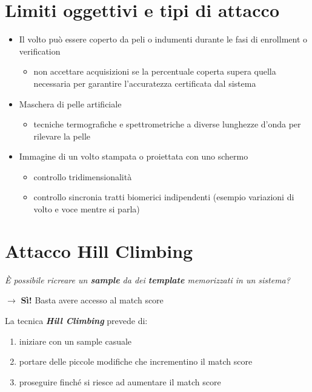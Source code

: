 \documentclass{report}
\begin{document}
\section{Limiti oggettivi e tipi di attacco}
\begin{itemize}
    \item Il volto può essere coperto da peli o indumenti durante 
    le fasi di enrollment o verification
    \begin{itemize}
        \item non accettare acquisizioni se la percentuale coperta supera 
        quella necessaria per garantire l'accuratezza certificata dal sistema
    \end{itemize}
    \item Maschera di pelle artificiale
    \begin{itemize}
        \item tecniche termografiche e spettrometriche a diverse lunghezze d'onda 
        per rilevare la pelle 
    \end{itemize}
    \item Immagine di un volto stampata o proiettata con uno schermo 
    \begin{itemize}
        \item controllo tridimensionalità 
        \item controllo sincronia tratti biomerici indipendenti (esempio 
        variazioni di volto e voce mentre si parla)
    \end{itemize}

\end{itemize}

\section{Attacco Hill Climbing}
\textit{È possibile ricreare un \textbf{sample} da dei \textbf{template}
memorizzati in un sistema?}

$\rightarrow$ \textbf{Sì!} Basta avere accesso al match score

La tecnica \textit{\textbf{Hill Climbing}} prevede di:
\begin{enumerate}
    \item iniziare con un sample casuale 
    \item portare delle piccole modifiche che incrementino il match score 
    \item proseguire finché si riesce ad aumentare il match score
\end{enumerate}
\end{document}
